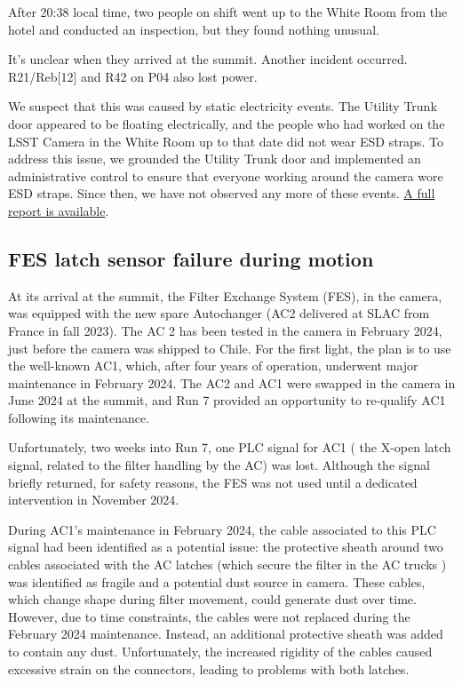 After 20:38 local time, two people on shift went up to the White Room from the hotel and conducted an inspection, but they found nothing unusual.

It's unclear when they arrived at the summit. Another incident occurred. R21/Reb[12] and R42 on P04 also lost power.

We suspect that this was caused by static electricity events. The Utility Trunk door appeared to be floating electrically, and the people who had worked on the LSST Camera in the White Room up to that date did not wear ESD straps. To address this issue, we grounded the Utility Trunk door and implemented an administrative control to ensure that everyone working around the camera wore ESD straps. Since then, we have not observed any more of these events.
\href{https://rubinobs.atlassian.net/wiki/spaces/CAM/pages/69763079/REB+trip+off+issue+08+29+24}{A full report is available}.

\clearpage
\subsection{FES latch sensor failure during motion}\label{sec:feslatchissue}
At its arrival at the summit, the Filter Exchange System (FES), in the camera, was equipped with the new spare Autochanger (AC2 delivered at SLAC from France in fall 2023). The AC 2 has been tested in the camera in February 2024, just before the camera was shipped to Chile. For the first light, the plan is to use the well-known AC1, which, after four years of operation, underwent major maintenance in February 2024. The AC2 and AC1 were swapped in the camera in June 2024 at the summit, and Run 7 provided an opportunity to re-qualify AC1 following its maintenance.


Unfortunately, two weeks into Run 7, one PLC signal for AC1 ( the X-open latch signal, related to the filter handling by the AC) was lost. Although the signal briefly returned, for safety reasons, the FES was not used until a dedicated intervention in November 2024.

During AC1’s maintenance in February 2024, the cable associated to this PLC signal had  been identified as a potential issue:  the protective sheath around two cables associated with the AC latches (which secure the filter in the AC trucks ) was identified as fragile and a potential dust source in camera. These cables, which change shape during filter movement, could generate dust over time. However, due to time constraints, the cables were not replaced during the February 2024 maintenance. Instead, an additional protective sheath was added to contain any dust. Unfortunately, the increased rigidity of the cables caused excessive strain on the connectors, leading to problems with both latches.


